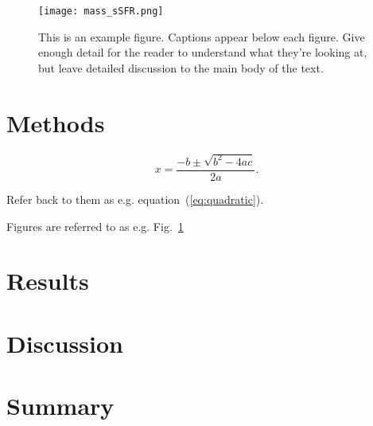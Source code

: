 \documentclass[fleqn,usenatbib]{mnras}
\begin{document}
\begin{figure}
	\texttt{[image: mass\_sSFR.png]}
    \caption{This is an example figure. Captions appear below each figure.
	Give enough detail for the reader to understand what they're looking at,
	but leave detailed discussion to the main body of the text.}
    \label{fig:mass_sSFR}
\end{figure}



\section{Methods}\label{sec:methods}

\begin{equation}
    x=\frac{-b\pm\sqrt{b^2-4ac}}{2a}.
	\label{eq:quadratic}
\end{equation}

Refer back to them as e.g. equation~(\ref{eq:quadratic}).

Figures are referred to as e.g. Fig.~\ref{fig:mass_sSFR}



\section{Results}\label{sec:results}



\section{Discussion}\label{sec:discussion}



\section{Summary}\label{sec:summary}






 




\label{lastpage}
\end{document}
